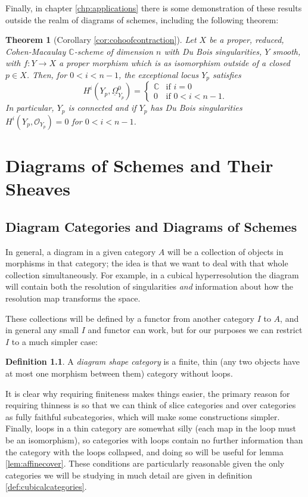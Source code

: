 \documentclass[proquest]{uwthesis}[2014/11/13]
\newtheorem{theorem}{Theorem}[section]
\theoremstyle{definition}
\newtheorem{definition}[theorem]{Definition}
\newcommand{\CC}{\mathbb{C}}
\newcommand{\OO}{\mathcal{O}}
\newcommand{\DB}{\underline{\Omega}}
\begin{document}
Finally, in chapter \ref{chp:applications} there is some demonstration of these results outside the realm of diagrams of schemes, including the following theorem:
\begin{theorem}[Corollary \ref{cor:cohoofcontraction}]
	Let $X$ be a proper, reduced, Cohen-Macaulay $\CC$-scheme of dimension $n$ with Du Bois singularities, $Y$ smooth, with $f : Y \rightarrow X$ a proper morphism which is as isomorphism outside of a closed $p \in X$.
	Then, for $0 < i < n - 1$, the exceptional locus $Y_p$ satisfies
	\[
	H^i (Y_p, \DB_{Y_p}^0) = \begin{cases}
	\CC & \text{if } i = 0 \\
	0 & \text{if } 0 < i < n - 1.
	\end{cases}
	\]
	In particular, $Y_p$ is connected and if $Y_p$ has Du Bois singularities $H^i(Y_p, \OO_{Y_p}) = 0$ for $0 < i < n - 1$.
\end{theorem}



\chapter{Diagrams of Schemes and Their Sheaves}
\label{chp:diagrams}
\section{Diagram Categories and Diagrams of Schemes}
In general, a diagram in a given category $A$ will be a collection of objects in morphisms in that category; the idea is that we want to deal with that whole collection simultaneously. For example, in a cubical hyperresolution the diagram will contain both the resolution of singularities \textit{and} information about how the resolution map transforms the space.

These collections will be defined by a functor from another category $I$ to $A$, and in general any small $I$ and functor can work, but for our purposes we can restrict $I$ to a much simpler case:
\begin{definition}
	A \textit{diagram shape category} is a finite, thin (any two objects have at most one morphism between them) category without loops.
\end{definition}

It is clear why requiring finiteness makes things easier, the primary reason for requiring thinness is so that we can think of slice categories and over categories as fully faithful subcategories, which will make some constructions simpler.
Finally, loops in a thin category are somewhat silly (each map in the loop must be an isomorphism), so categories with loops contain no further information than the category with the loops collapsed, and doing so will be useful for lemma \ref{lem:affinecover}.
These conditions are particularly reasonable given the only categories we will be studying in much detail are given in definition \ref{def:cubicalcategories}.
\end{document}

